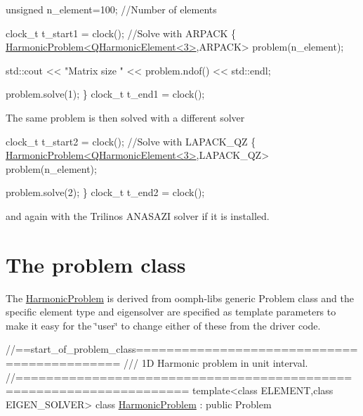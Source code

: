 \begin{DoxyCodeInclude}
 \textcolor{keywordtype}{unsigned} n\_element=100; \textcolor{comment}{//Number of elements}

 clock\_t t\_start1 = clock();
 \textcolor{comment}{//Solve with ARPACK}
 \{
  \hyperlink{classHarmonicProblem}{HarmonicProblem<QHarmonicElement<3>},ARPACK> 
   problem(n\_element);
  
  std::cout << \textcolor{stringliteral}{"Matrix size "} << problem.ndof() << std::endl;
  
  problem.solve(1);
 \}
 clock\_t t\_end1 = clock();

\end{DoxyCodeInclude}


The same problem is then solved with a different solver


\begin{DoxyCodeInclude}
 clock\_t t\_start2 = clock();
 \textcolor{comment}{//Solve with LAPACK\_QZ}
 \{
  \hyperlink{classHarmonicProblem}{HarmonicProblem<QHarmonicElement<3>},LAPACK\_QZ> 
   problem(n\_element);
  
  problem.solve(2);
 \}
 clock\_t t\_end2 = clock();

\end{DoxyCodeInclude}


and again with the Trilinos A\+N\+A\+S\+A\+ZI solver if it is installed.



 

\hypertarget{index_problem}{}\section{The problem class}\label{index_problem}
The {\ttfamily \hyperlink{classHarmonicProblem}{Harmonic\+Problem}} is derived from {\ttfamily oomph-\/lib\textquotesingle{}s} generic {\ttfamily Problem} class and the specific element type and eigensolver are specified as template parameters to make it easy for the \char`\"{}user\char`\"{} to change either of these from the driver code.

 
\begin{DoxyCodeInclude}
\textcolor{comment}{//==start\_of\_problem\_class============================================}
\textcolor{comment}{/// 1D Harmonic problem in unit interval.}
\textcolor{comment}{}\textcolor{comment}{//====================================================================}
\textcolor{keyword}{template}<\textcolor{keyword}{class} ELEMENT,\textcolor{keyword}{class} EIGEN\_SOLVER> 
\textcolor{keyword}{class }\hyperlink{classHarmonicProblem}{HarmonicProblem} : \textcolor{keyword}{public} Problem

\end{DoxyCodeInclude}


